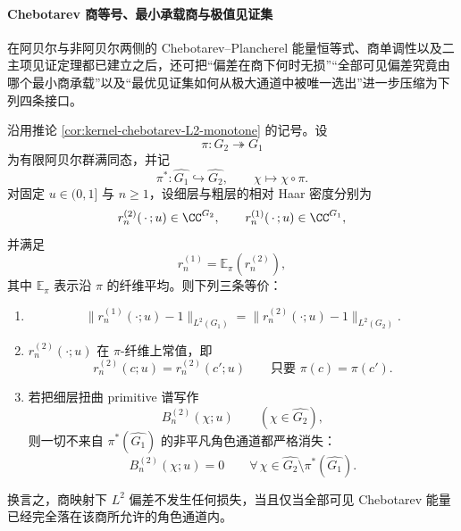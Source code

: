 \paragraph{Chebotarev 商等号、最小承载商与极值见证集}
在阿贝尔与非阿贝尔两侧的 Chebotarev--Plancherel 能量恒等式、商单调性以及二主项见证定理都已建立之后，还可把“偏差在商下何时无损”“全部可见偏差究竟由哪个最小商承载”以及“最优见证集如何从极大通道中被唯一选出”进一步压缩为下列四条接口。

\begin{theorem}\label{thm:xi-time-part64aa-abelian-quotient-equality-criterion}
沿用推论 \ref{cor:kernel-chebotarev-L2-monotone} 的记号。设
\[
\pi:G_2\twoheadrightarrow G_1
\]
为有限阿贝尔群满同态，并记
\[
\pi^\ast:\widehat{G_1}\hookrightarrow \widehat{G_2},
\qquad
\chi\longmapsto \chi\circ\pi.
\]
对固定 \(u\in(0,1]\) 与 \(n\ge 1\)，设细层与粗层的相对 Haar 密度分别为
\[
r_n^{(2)}(\,\cdot\,;u)\in \CC^{G_2},
\qquad
r_n^{(1)}(\,\cdot\,;u)\in \CC^{G_1},
\]
并满足
\[
r_n^{(1)}=\mathbb E_\pi(r_n^{(2)}),
\]
其中 \(\mathbb E_\pi\) 表示沿 \(\pi\) 的纤维平均。则下列三条等价：
\begin{enumerate}
  \item
  \[
  \boxed{\;
  \|r_n^{(1)}(\cdot;u)-1\|_{L^2(G_1)}
  =
  \|r_n^{(2)}(\cdot;u)-1\|_{L^2(G_2)}.\;}
  \]
  \item \(r_n^{(2)}(\cdot;u)\) 在 \(\pi\)-纤维上常值，即
  \[
  \boxed{\;
  r_n^{(2)}(c;u)=r_n^{(2)}(c';u)
  \qquad
  \text{只要 }\pi(c)=\pi(c').\;}
  \]
  \item 若把细层扭曲 primitive 谱写作
  \[
  B_n^{(2)}(\chi;u)
  \qquad
  (\chi\in \widehat{G_2}),
  \]
  则一切不来自 \(\pi^\ast(\widehat{G_1})\) 的非平凡角色通道都严格消失：
  \[
  \boxed{\;
  B_n^{(2)}(\chi;u)=0
  \qquad
  \forall\,\chi\in \widehat{G_2}\setminus \pi^\ast(\widehat{G_1}).\;}
  \]
\end{enumerate}
换言之，商映射下 \(L^2\) 偏差不发生任何损失，当且仅当全部可见 Chebotarev 能量已经完全落在该商所允许的角色通道内。
\end{theorem}
